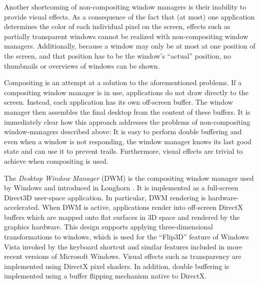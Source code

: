 			Another shortcoming of non-compositing window managers is their
			inability to provide visual effects. As a consequence of the fact
			that (at most) one application determines the color of each individual
			pixel on the screen, effects such as partially transparent windows
			cannot be realized with non-compositing window managers. Additionally,
			because a window may only be at most at one position of the screen,
			and that position has to be the window's \enquote{actual} position,
			no thumbnails or overviews of windows can be shown.

			Compositing is an attempt at a solution to the aforementioned
			problems.  If a compositing window manager is in use, applications
			do not draw directly to the screen. Instead, each application has
			its own off-screen buffer. The
			window manager then assembles the final
			desktop from the content of these buffers. It is immediately clear how this approach addresses the
			problems of non-compositing window-managers described above: It is
			easy to perform double buffering and even when a window is not
			responding, the window manager knows its last good state and can
			use it to prevent trails. Furthermore, visual effects are trivial
			to achieve when compositing is used. \cite{dwmoverview}

		\label{sec:dwm}
			The \emph{Desktop Window Manager} (DWM) is the compositing window
			manager used by Windows and introduced in Longhorn
			\cite{dwmoverview}. It is implemented as a full-screen Direct3D
			user-space application. In particular, DWM rendering is
			hardware-accelerated. When DWM is active, applications render into
			off-screen DirectX buffers which are mapped onto flat surfaces in
			3D space and rendered by the graphics hardware. This design supports
			applying three-dimensional transformations to windows,
			which is used for the
			\enquote{Flip3D} feature of Windows Vista invoked by the keyboard
			shortcut  and similar features included in more
			recent versions of Microsoft Windows. Visual effects such as
			transparency are implemented using DirectX pixel shaders. In addition,
			double buffering is implemented using a buffer flipping mechanism
			native to DirectX.
			\cite{dwmdirectx}

